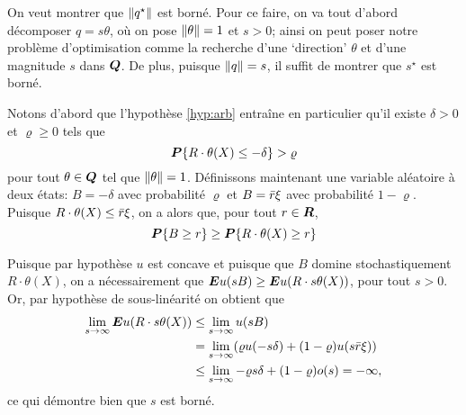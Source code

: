 \begin{lemme}
  On veut montrer que $\|q^\star\|$ est borné. Pour ce faire, on va tout d'abord décomposer
  $q = s\theta$, où on pose $\|\theta\|=1$ et $s>0$; ainsi on peut poser notre problème
  d'optimisation comme la recherche d'une `direction' $\theta$ et d'une magnitude $s$ dans
  $\bm Q$. De plus, puisque $\|q\| = s$, il suffit de montrer que $s^\star$ est borné.

  Notons d'abord que l'hypothèse \ref{hyp:arb} entraîne en particulier qu'il existe
  $\delta > 0$ et $\varrho \geq 0$ tels que
  \begin{equation}
    \bm P\{R\cdot \theta(X) \leq -\delta\} > \varrho
  \end{equation}
  pour tout $\theta \in \bm Q$ tel que $\|\theta\| = 1$. Définissons maintenant une variable aléatoire à
  deux états: $B = -\delta$ avec probabilité $\varrho$ et $B = \bar r\xi$ avec probabilité
  $1-\varrho$. Puisque $R\cdot \theta(X) \leq \bar r\xi$, on a alors que, pour tout $r \in \bm{R}$,
  \begin{equation}
    \bm P\{B\geq r\} \geq \bm P\{R\cdot \theta(X)\geq r\}
  \end{equation}

  Puisque par hypothèse $u$ est concave et puisque que $B$ domine stochastiquement
  $R\cdot \theta(X)$, on a nécessairement que $\bm E u(sB) \geq \bm E u(R\cdot s\theta(X))$, pour tout
  $s > 0$. Or, par hypothèse de sous-linéarité on obtient que
  \begin{align}
    \lim_{s\to\infty}\bm E u(R\cdot s\theta(X)) &\leq \lim_{s\to\infty}u(sB)\\
                             & = \lim_{s\to\infty}(\varrho u(-s\delta) + (1-\varrho)u(s\bar r\xi))\\
                             & \leq\lim_{s\to\infty}-\varrho s \delta + (1-\varrho)o(s) = -\infty,
  \end{align}
  ce qui démontre bien que $s$ est borné.
\end{lemme}



\begin{lemme}
  
\end{lemme}




